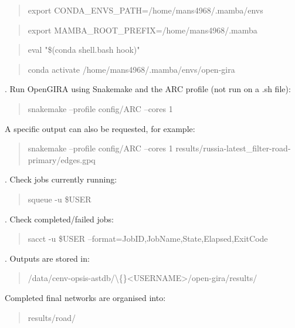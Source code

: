\documentclass[11pt,a4paper]{article}
\begin{document}
\begin{quote}\ttfamily export CONDA\_ENVS\_PATH=/home/mans4968/.mamba/envs\end{quote}

\begin{quote}\ttfamily export MAMBA\_ROOT\_PREFIX=/home/mans4968/.mamba\end{quote}

\begin{quote}\ttfamily eval "\$(conda shell.bash hook)"\end{quote}

\begin{quote}\ttfamily conda activate /home/mans4968/.mamba/envs/open-gira\end{quote}

. Run OpenGIRA using Snakemake and the ARC profile (not run on a .sh file):

\begin{quote}\ttfamily snakemake --profile config/ARC --cores 1\end{quote}

A specific output can also be requested, for example:\par

\begin{quote}\ttfamily snakemake --profile config/ARC --cores 1 results/russia-latest\_filter-road-primary/edges.gpq\end{quote}

. Check jobs currently running:

\begin{quote}\ttfamily squeue -u \$USER\end{quote}

. Check completed/failed jobs:

\begin{quote}\ttfamily sacct -u \$USER --format=JobID,JobName,State,Elapsed,ExitCode\end{quote}

. Outputs are stored in:

\begin{quote}\ttfamily /data/cenv-opsis-astdb/\textbackslash\{\}<USERNAME>/open-gira/results/\end{quote}

Completed final networks are organised into:\par

\begin{quote}\ttfamily results/road/\end{quote}
\end{document}
